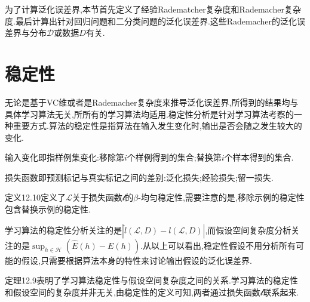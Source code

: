 为了计算泛化误差界,本节首先定义了经验Radematcher复杂度和Rademacher复杂度.最后计算出针对回归问题和二分类问题的泛化误差界.这些Rademacher的泛化误差界与分布$\mathcal D$或数据$D$有关.

\section{稳定性}

无论是基于VC维或者是Rademacher复杂度来推导泛化误差界,所得到的结果均与具体学习算法无关,所所有的学习算法均适用.稳定性分析是针对学习算法考察的一种重要方式.算法的稳定性是指算法在输入发生变化时,输出是否会随之发生较大的变化.

输入变化即指样例集变化:移除第$i$个样例得到的集合;替换第$i$个样本得到的集合.

损失函数即预测标记与真实标记之间的差别:泛化损失;经验损失;留一损失.

定义12.10定义了$\mathcal L$关于损失函数$\mathcal l$的$\beta$-均匀稳定性,需要注意的是,移除示例的稳定性包含替换示例的稳定性.

学习算法的稳定性分析关注的是$|\hat l(\mathcal L,D)-l(\mathcal L,D)|$,而假设空间复杂度分析关注的是$\sup_{h\in\mathcal H}(\widehat E(h)-E(h))$.从以上可以看出,稳定性假设不用分析所有可能的假设,只需要根据算法本身的特性来讨论输出假设的泛化误差界.

定理12.9表明了学习算法稳定性与假设空间复杂度之间的关系.学习算法的稳定性和假设空间的复杂度并非无关,由稳定性的定义可知,两者通过损失函数$\mathcal l$联系起来.